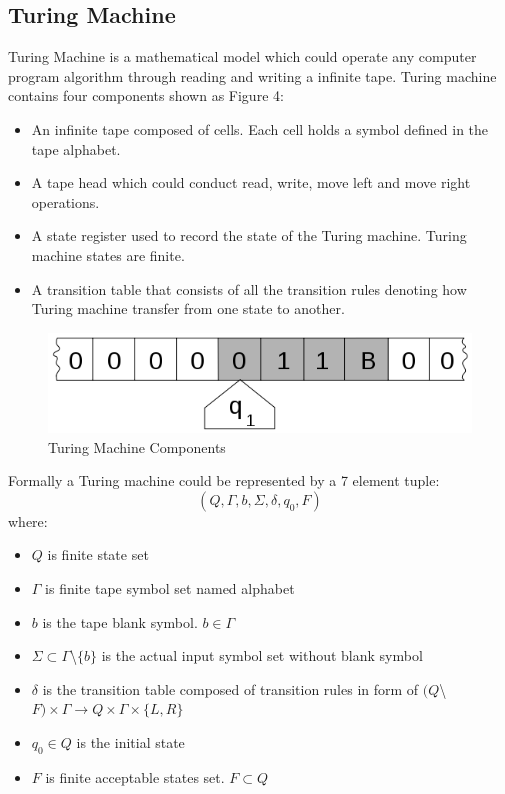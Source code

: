 \documentclass[lnicst]{svmultln}
\begin{document}
\subsection{Turing Machine}
Turing Machine is a mathematical model which could operate any computer program algorithm through reading and writing a infinite tape. Turing machine contains four components shown as Figure 4\cite{Turing}:
\begin{itemize}
  \item An infinite tape composed of cells. Each cell holds a symbol defined in the tape alphabet.
  \item A tape head which could conduct read, write, move left and move right operations.
  \item A state register used to record the state of the Turing machine. Turing machine states are finite.
  \item A transition table that consists of all the transition rules denoting how Turing machine transfer from one state to another.
\end{itemize}
\begin{figure}
 \includegraphics[width=0.9\linewidth]{Tm_tape.png}
 \caption{Turing Machine Components\cite{Turing}}
 \label{Figure 3}
\end{figure}
Formally a Turing machine could be represented by a 7 element tuple\cite{Turing}: \[ (Q, \Gamma, b, \Sigma, \delta, q_0, F) \] 
where:
\begin{itemize}
  \item \(Q\) is finite state set
  \item \(\Gamma\) is finite tape symbol set named alphabet
  \item \(b\) is the tape blank symbol. \(b \in \Gamma\)
  \item \(\Sigma \subset \Gamma \)\textbackslash  \(\{b\}\) is the actual input symbol set without blank symbol
  \item \(\delta\) is the transition table composed of transition rules in form of \((Q\)\textbackslash \(F)\times\Gamma \rightarrow Q \times \Gamma \times \{L,R\}\) 
  \item \(q_0 \in Q \) is the initial state
  \item \(F\) is finite acceptable states set. \(F \subset Q\)
\end{itemize}
\end{document}
